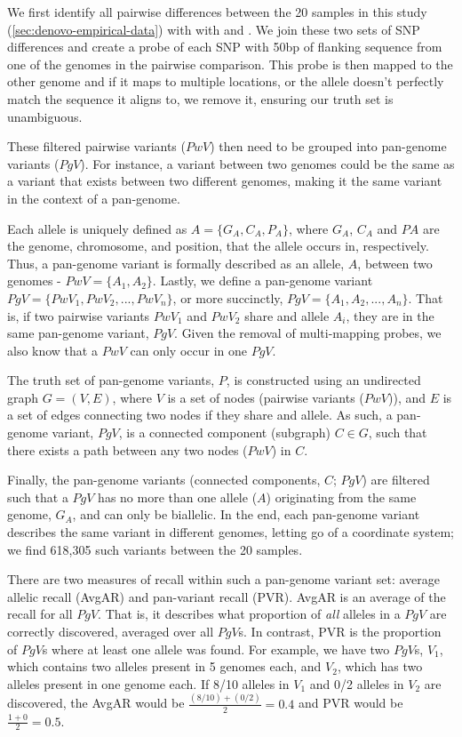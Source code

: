 We first identify all pairwise differences between the 20 samples in this study (\autoref{sec:denovo-empirical-data}) with with  \cite{mummer2018} and  \cite{li2018}. We join these two sets of SNP differences and create a probe of each SNP with 50bp of flanking sequence from one of the genomes in the pairwise comparison. This probe is then mapped to the other genome and if it maps to multiple locations, or the allele doesn't perfectly match the sequence it aligns to, we remove it, ensuring our truth set is unambiguous.

These filtered pairwise variants ($PwV$) then need to be grouped into pan-genome variants ($PgV$). For instance, a variant between two genomes could be the same as a variant that exists between two different genomes, making it the same variant in the context of a pan-genome.

Each allele is uniquely defined as $A=\{G_A,C_A,P_A\}$, where $G_A$, $C_A$ and $PA$ are the genome, chromosome, and position, that the allele occurs in, respectively. Thus, a pan-genome variant is formally described as an allele, $A$, between two genomes - $PwV=\{A_1,A_2\}$. Lastly, we define a pan-genome variant $PgV=\{PwV_1,PwV_2,...,PwV_n\}$, or more succinctly, $PgV=\{A_1,A_2,...,A_n\}$. That is, if two pairwise variants $PwV_1$ and $PwV_2$ share and allele $A_i$, they are in the same pan-genome variant, $PgV$. Given the removal of multi-mapping probes, we also know that a $PwV$ can only occur in one $PgV$.

The truth set of pan-genome variants, $P$, is constructed using an undirected graph $G=(V,E)$, where $V$ is a set of nodes (pairwise variants ($PwV$)), and $E$ is a set of edges connecting two nodes if they share and allele. As such, a pan-genome variant, $PgV$, is a connected component (subgraph) $C \in G$, such that there exists a path between any two nodes ($PwV$) in $C$.

Finally, the pan-genome variants (connected components, $C$; $PgV$) are filtered such that a $PgV$ has no more than one allele ($A$) originating from the same genome, $G_A$, and can only be biallelic. In the end, each pan-genome variant describes the same variant in different genomes, letting go of a coordinate system; we find 618,305 such variants between the 20 samples.

\noindent
There are two measures of recall within such a pan-genome variant set: average allelic recall (AvgAR) and pan-variant recall (PVR). AvgAR is an average of the recall for all $PgV$. That is, it describes what proportion of \emph{all} alleles in a $PgV$ are correctly discovered, averaged over all $PgV$s. In contrast, PVR is the proportion of $PgV$s where at least one allele was found. For example, we have two $PgV$s,  $V_1$, which contains two alleles present in 5 genomes each, and $V_2$, which has two alleles present in one genome each. If 8/10 alleles in $V_1$ and 0/2 alleles in $V_2$ are discovered, the AvgAR would be $\frac{(8/10)+(0/2)}{2}=0.4$ and PVR would be $\frac{1+0}{2}=0.5$.